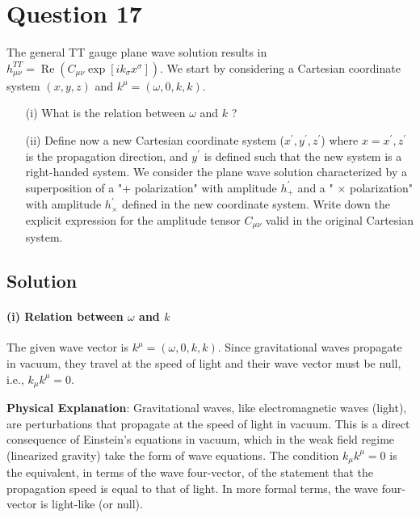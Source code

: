 \documentclass{article}
\begin{document}
\pagebreak

\section*{Question 17}
The general TT gauge plane wave solution results in $h_{\mu \nu}^{T T}=\operatorname{Re}\left(C_{\mu \nu} \exp \left[i k_{\sigma} x^{\sigma}\right]\right)$. We start by considering a Cartesian coordinate system $(x, y, z)$ and $k^{\mu}=(\omega, 0, k, k)$.
\begin{enumerate}
    \item[(i)] What is the relation between $\omega$ and $k$ ?
    \item[(ii)] Define now a new Cartesian coordinate system ($x^{\prime}, y^{\prime}, z^{\prime}$) where $x=x^{\prime}, z^{\prime}$ is the propagation direction, and $y^{\prime}$ is defined such that the new system is a right-handed system. We consider the plane wave solution characterized by a superposition of a "+ polarization" with amplitude $h_{+}^{\prime}$ and a " $\times$ polarization" with amplitude $h_{\times}^{\prime}$ defined in the new coordinate system. Write down the explicit expression for the amplitude tensor $C_{\mu \nu}$ valid in the original Cartesian system.
\end{enumerate}

\subsection*{Solution}

\paragraph{(i) Relation between $\omega$ and $k$}

The given wave vector is $k^{\mu} = (\omega, 0, k, k)$. Since gravitational waves propagate in vacuum, they travel at the speed of light and their wave vector must be null, i.e., $k_{\mu}k^{\mu}=0$.

\textbf{Physical Explanation}: Gravitational waves, like electromagnetic waves (light), are perturbations that propagate at the speed of light in vacuum. This is a direct consequence of Einstein's equations in vacuum, which in the weak field regime (linearized gravity) take the form of wave equations. The condition $k_{\mu}k^{\mu}=0$ is the equivalent, in terms of the wave four-vector, of the statement that the propagation speed is equal to that of light. In more formal terms, the wave four-vector is light-like (or null).
\end{document}
